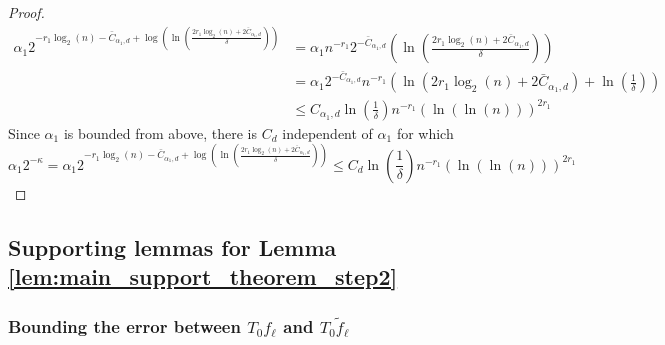 \documentclass[12pt]{article}
\theoremstyle{remark}
\newcommand{\wtilde}[1]{\widetilde{#1}}
\newcommand{\maxangle}{\angle_{\max}}
\begin{document}
\begin{appendices}
\begin{proof}
       \begin{equation}
    \begin{array}{ll}
     \alpha_1 2^{-r_1\log_2(n) - \bar{C}_{\alpha_1,d} + \log\left(\ln\left(\frac{2r_1\log_2(n) + 2 \bar{C}_{\alpha_1,d}}{\delta}\right)\right)} &=   \alpha_1 n^{-r_1}2^{-\bar{C}_{ \alpha_1,d}}\left(\ln\left(\frac{2r_1\log_2(n) + 2\bar{C}_{ \alpha_1,d}}{\delta}\right)\right)
     \\
         & =  \alpha_1 2^{-\bar{C}_{\alpha_1,d}} n^{-r_1}\left(\ln\left(2r_1\log_2(n) + 2\bar{C}_{ \alpha_1,d}\right)+\ln\left(\frac{1}{\delta}\right)\right)\\
         & \leq C_{ \alpha_1,d} \ln\left(\frac{1}{\delta}\right) n^{-r_1}\left(\ln\left(\ln(n) \right)\right)^{2r_1}
    \end{array}
    \end{equation}
    Since $\alpha_1$ is bounded from above, there is  $ C_{d}$ independent of $\alpha_1$ for which
    \begin{equation}
      \alpha_1 2^{-\kappa} = \alpha_1 2^{-r_1\log_2(n) - \bar{C}_{ \alpha_1,d} + \log\left(\ln\left(\frac{2r_1\log_2(n) + 2 \bar{C}_{ \alpha_1,d}}{\delta}\right)\right)} \leq C_{ d} \ln\left(\frac{1}{\delta}\right) n^{-r_1}\left(\ln\left(\ln(n) \right)\right)^{2r_1}
    \end{equation}
\end{proof}



\subsection{Supporting lemmas for Lemma \ref{lem:main_support_theorem_step2}}
\label{sec:ProofofLemAlphaHalf}

\subsubsection{Bounding the error between $T_0 {f_\ell}$ and $T_0\wtilde{f}_\ell$}\label{sec:Tf_Tf_tilde_err}
\usetikzlibrary{calc}

\begin{figure}
    \centering
\end{figure}
\end{appendices}
\end{document}
